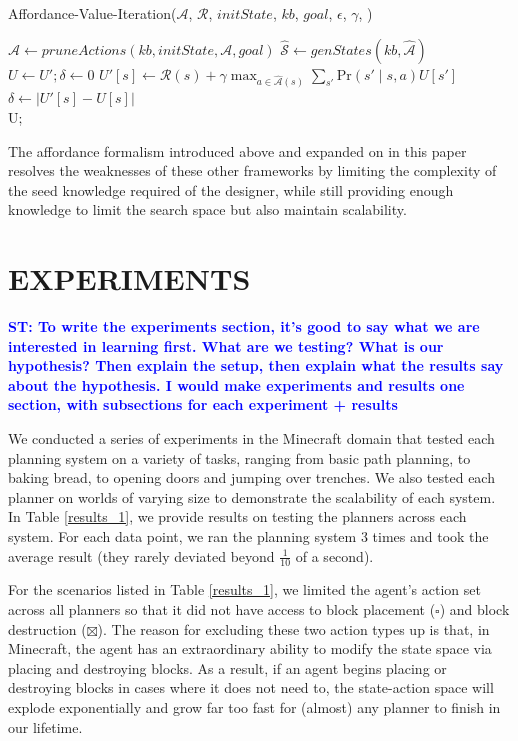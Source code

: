 \documentclass[]{article}
\newcommand{\stnote}[1]{\textcolor{Blue}{\textbf{ST: #1}}}
\begin{document}
\begin{algorithm}
  \caption{Affordance-Value-Iteration($\mathcal{A}$, $\mathcal{R}$, $initState$, $kb$, $goal$, $\epsilon$, $\gamma$, )}
  \begin{algorithmic}[1]
    \State $\hat{\mathcal{A}} \gets pruneActions(kb, initState, \mathcal{A}, goal)$
    \State $\hat{\mathcal{S}} \gets genStates(kb, \hat{\mathcal{A}})$
    \State $U \gets U';\delta \gets 0$
    \State $U'[s] \leftarrow \mathcal{R}(s) + \gamma \max_{a \in \hat{\mathcal{A}}(s)} \sum_{s'} \text{Pr}(s'\mid s,a) U[s']$
    	\State $\delta \gets |U'[s] - U[s]|$ 
    \EndIf
    \EndFor
    \EndWhile\\
    \Return U;
  \end{algorithmic}
  \label{alg:vi}
\end{algorithm}


The affordance formalism introduced above and expanded on in this
paper resolves the weaknesses of these other frameworks by limiting
the complexity of the seed knowledge required of the designer, while
still providing enough knowledge to limit the search space but also
maintain scalability.

\section{EXPERIMENTS}

\stnote{To write the experiments section, it's good to say what we are
  interested in learning first.  What are we testing?  What is our
  hypothesis?  Then explain the setup, then explain what the results
  say about the hypothesis.  I would make experiments and results one
  section, with subsections for each experiment + results}

We conducted a series of experiments in the Minecraft domain that
tested each planning system on a variety of tasks, ranging from basic
path planning, to baking bread, to opening doors and jumping over
trenches.  We also tested each planner on worlds of varying size to
demonstrate the scalability of each system. In Table \ref{results_1},
we provide results on testing the planners across each system. For
each data point, we ran the planning system 3 times and took the
average result (they rarely deviated beyond $\frac{1}{10}$ of a
second).

For the scenarios listed in Table \ref{results_1}, we limited the agent's 
action set across all planners so that it did not have access to block 
placement ($\square$) and block destruction ($\boxtimes$). The reason 
for excluding these two action types up is that, in Minecraft, the agent 
has an extraordinary ability to modify the state space via placing and 
destroying blocks. As a result, if an agent begins placing or destroying 
blocks in cases where it does not need to, the state-action space will 
explode exponentially and grow far too fast for (almost) any planner to 
finish in our lifetime. 
\end{document}
